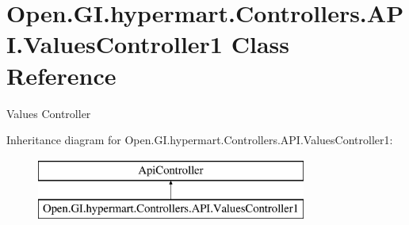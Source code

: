 \hypertarget{class_open_1_1_g_i_1_1hypermart_1_1_controllers_1_1_a_p_i_1_1_values_controller1}{}\section{Open.\+G\+I.\+hypermart.\+Controllers.\+A\+P\+I.\+Values\+Controller1 Class Reference}
\label{class_open_1_1_g_i_1_1hypermart_1_1_controllers_1_1_a_p_i_1_1_values_controller1}


Values Controller  


Inheritance diagram for Open.\+G\+I.\+hypermart.\+Controllers.\+A\+P\+I.\+Values\+Controller1\+:\begin{figure}[H]
\begin{center}
\leavevmode
\includegraphics[height=2.000000cm]{class_open_1_1_g_i_1_1hypermart_1_1_controllers_1_1_a_p_i_1_1_values_controller1}
\end{center}
\end{figure}
